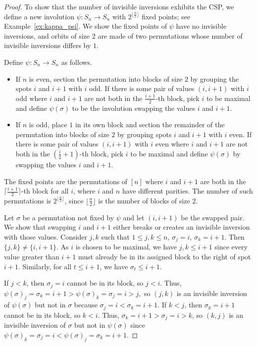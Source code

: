 \documentclass{amsart}
\theoremstyle{definition}
\begin{document}
\begin{proof}
  To show that the number of invisible inversions exhibits the CSP, we define a new involution $\psi: S_n \rightarrow S_n$ with $2^{\lfloor\frac{n}{2} \rfloor}$ fixed points; see Example~\ref{ex:kappa_psi}. We show the fixed points of $\psi$ have no invisible inversions, and orbits of size $2$ are made of two permutations whose number of invisible inversions differs by $1$. 

Define $\psi: S_n \rightarrow S_n$ as follows.

\begin{itemize}

    \item If $n$ is even, section the permutation into blocks of size $2$ by grouping the spots $i$ and $i + 1$ with $i$ odd. If there is some pair of values $(i, i+1)$ with $i$ odd where $i$ and $i + 1$ are not both in the $\frac{i+1}{2}$-th block, pick $i$ to be maximal and define $\psi(\sigma)$ to be the involution swapping the values $i$ and $i + 1$.

    \item If $n$ is odd, place $1$ in its own block and section the remainder of the permutation into blocks of size $2$ by grouping spots $i$ and $i + 1$ with $i$ even.  If there is some pair of values $(i, i+1)$ with $i$ even where $i$ and $i + 1$ are not both in the $\left(\frac{i}{2} + 1\right)$-th block, pick $i$ to be maximal and define $\psi(\sigma)$ by swapping the values $i$ and $i + 1$.

\end{itemize}
The fixed points are the permutations of $[n]$ where $i$ and $i+1$ are both in the $\lceil \frac{i+1}{2}\rceil$-th block for all $i$, where $i$ and $n$ have different parities. The number of such permutations is $2^{\lfloor\frac{n}{2} \rfloor}$, since ${\lfloor\frac{n}{2} \rfloor}$ is the number of blocks of size $2$.
  
  Let $\sigma$ be a permutation not fixed by $\psi$ and let $(i, i + 1)$ be the swapped pair. We show that swapping $i$ and $i + 1$ either breaks or creates an invisible inversion with those values. Consider $j, k$ such that $1 \leq j, k \leq n$, $\sigma_j = i$, $\sigma_k = i + 1$. Then $\{j , k\} \neq \{i, i+1 \}$. As $i$ is chosen to be maximal, we have $j, k \leq i+ 1$ since every value greater than $i + 1$ must already be in its assigned block to the right of spot $i + 1$. Similarly, for all $t \leq i + 1$, we have $\sigma_t \leq i + 1$.

  If $j < k$, then $\sigma_ j = i$ cannot be in its block, so $j < i$. Thus, $\psi(\sigma)_j = \sigma_k = i + 1 > \psi(\sigma)_k = \sigma_j = i > j,$ so $(j, k)$ is an invisible inversion of $\psi(\sigma)$ but not in $\sigma$ because $\sigma_j = i < \sigma_k = i + 1$. If $k < j$, then $\sigma_k = i + 1$ cannot be in its block, so $k < i$. Thus, $\sigma_k = i + 1 > \sigma_j = i > k$, so $(k , j)$ is an invisible inversion of $\sigma$ but not in $\psi(\sigma)$ since $\psi(\sigma)_k = \sigma_j = i < \psi(\sigma)_j = \sigma_k = i +1$.


\end{proof}
\end{document}
